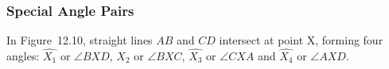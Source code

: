             \subsubsection{ Special Angle Pairs}
            \nopagebreak
        \label{m39370*id315274}In Figure~12.10, straight lines \begin{math}AB\end{math} and \begin{math}CD\end{math} intersect at point X, forming four angles: \begin{math}\hat{{X}_{1}}\end{math} or \begin{math}\angle BXD\end{math}\hspace{1ex}, \begin{math}\hat{{X}_{2}}\end{math}\hspace{1ex} or \begin{math}\angle BXC\end{math}\hspace{1ex}, \begin{math}\hat{{X}_{3}}\end{math}\hspace{1ex} or \begin{math}\angle CXA\end{math}\hspace{1ex} and \begin{math}\hat{{X}_{4}}\end{math}\hspace{1ex} or \begin{math}\angle AXD\end{math}\hspace{1ex}.\par 
    \setcounter{subfigure}{0}
